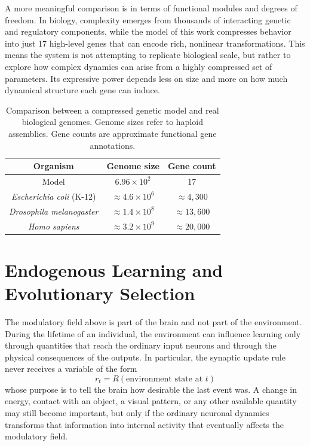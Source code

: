 \documentclass[12pt,a4paper]{article}
\begin{document}
A more meaningful comparison is in terms of functional modules and degrees of freedom. In biology, complexity emerges from thousands of interacting genetic and regulatory components, while the model of this work compresses behavior into just 17 high-level genes that can encode rich, nonlinear transformations. This means the system is not attempting to replicate biological scale, but rather to explore how complex dynamics can arise from a highly compressed set of parameters. Its expressive power depends less on size and more on how much dynamical structure each gene can induce.

	\begin{table}[h]
	\centering
	\begin{tabular}{|c|c|c|}
		\hline
		\textbf{Organism} & \textbf{Genome size} & \textbf{Gene count} \\
		\hline
		Model & $6.96 \times 10^{2}$ & 17 \\
		\textit{Escherichia coli} (K-12) & $\approx 4.6 \times 10^{6}$ & $\approx 4{,}300$  \\
		\textit{Drosophila melanogaster} & $\approx 1.4 \times 10^{8}$ & $\approx 13{,}600$  \\
		\textit{Homo sapiens} & $\approx 3.2 \times 10^{9}$ & $\approx 20{,}000$  \\
		\hline
	\end{tabular}
	\caption{\footnotesize{Comparison between a compressed genetic model and real biological genomes. Genome sizes refer to haploid assemblies. Gene counts are approximate functional gene annotations.}}
	\end{table}
	

\section{Endogenous Learning and Evolutionary Selection}

	The modulatory field above is part of the brain and not part of the environment. During the lifetime of an individual, the environment can influence learning only through quantities that reach the ordinary input neurons and through the physical consequences of the outputs. In particular, the synaptic update rule never receives a variable of the form
	$$r_t=R(\text{environment state at }t)$$
	whose purpose is to tell the brain how desirable the last event was. A change in energy, contact with an object, a visual pattern, or any other available quantity may still become important, but only if the ordinary neuronal dynamics transforms that information into internal activity that eventually affects the modulatory field.
\end{document}

